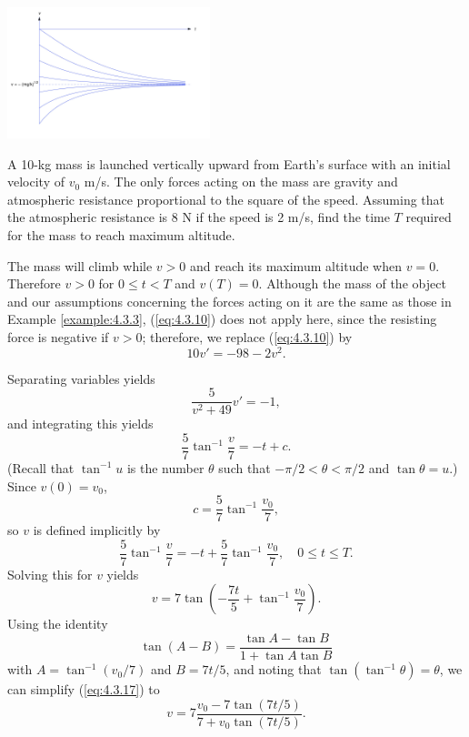 \documentclass{ximera}
\begin{document}
\begin{example}
\begin{explanation}
\begin{image}
  \includegraphics[height=1.5in]{fig040303.jpg} 
\end{image}
\end{explanation}
\end{example}

\begin{example}\label{example:4.3.4}
A 10-kg mass is launched vertically upward from Earth's surface with
an initial velocity of $v_0$ m/s. The only forces acting on the mass
are gravity and atmospheric resistance proportional to the square of
the speed. Assuming that the atmospheric resistance is 8 N if the
speed is 2 m/s, find the time $T$ required for the mass to reach
maximum altitude.


\begin{explanation}  The mass will
climb while $v>0 $ and reach its maximum altitude when $v=0$.
Therefore $v>0$ for $0\leq t<T$ and $v(T)=0$. Although the mass of
the object and our assumptions concerning the forces acting on it are
the same as those in Example \ref{example:4.3.3},  (\ref{eq:4.3.10}) does
not apply here, since the resisting force is negative if $v>0$;
therefore, we replace (\ref{eq:4.3.10}) by
\begin{equation} \label{eq:4.3.15}
10v'=-98-2v^2.
\end{equation}

Separating variables  yields
$$
\frac{5}{v^2+49}v'=-1,
$$
 and integrating this yields
$$
\frac{5}{7}\tan^{-1}\frac{v}{7}=-t+c.
$$
 (Recall that $\tan^{-1}u$ is the number $\theta$
such that $-\pi/2 < \theta < \pi/2$ and $\tan \theta=u$.)
 Since $v(0)=v_0$,
$$
c=\frac{5}{7}\tan^{-1}\frac{v_0}{7},
$$
so $v$ is defined implicitly by
\begin{equation} \label{eq:4.3.16}
\frac{5}{7} \tan^{-1}\frac{v}{7}=-t+\frac{5}{7}
\tan^{-1}\frac{v_0}{7}, \quad 0\leq t\leq T.
\end{equation}
Solving this for $v$ yields
\begin{equation} \label{eq:4.3.17}
v=7\tan\left(-\frac{7t}{5}+\tan^{-1}\frac{v_0}{7}\right).
\end{equation}
Using the identity
$$
\tan(A-B)=\frac{\tan A-\tan B}{1+\tan A\tan B}
$$
with $A=\tan^{-1}(v_0/7)$ and $B=7t/5$, and noting that
$\tan(\tan^{-1}\theta)=\theta$,
we can simplify (\ref{eq:4.3.17}) to
$$
v=7\frac{v_0-7\tan(7t/5)}{7+v_0\tan(7t/5)}.
$$


\end{explanation}
\end{example}
\end{document}
